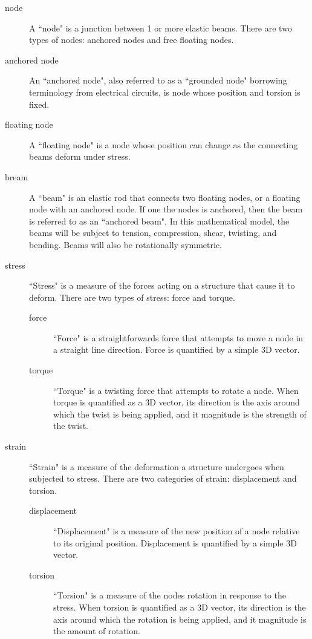 \documentclass{article}
\begin{document}
\begin{description}
\item[node] A ``node" is a junction between 1 or more elastic beams. There are two types of nodes: anchored nodes and free floating nodes.
\item[anchored node] An ``anchored node", also referred to as a ``grounded node" borrowing terminology from electrical circuits, is node whose position and torsion is fixed.
\item[floating node] A ``floating node" is a node whose position can change as the connecting beams deform under stress. 
\item[bream] A ``beam" is an elastic rod that connects two floating nodes, or a floating node with an anchored node. If one the nodes is anchored, then the beam is referred to as an ``anchored beam". In this mathematical model, the beams will be subject to tension, compression, shear, twisting, and bending. Beams will also be rotationally symmetric.
\item[stress] ``Stress" is a measure of the forces acting on a structure that cause it to deform. There are two types of stress: force and torque.
\begin{description}
\item[force] ``Force" is a straightforwards force that attempts to move a node in a straight line direction. Force is quantified by a simple 3D vector.
\item[torque] ``Torque" is a twisting force that attempts to rotate a node. When torque is quantified as a 3D vector, its direction is the axis around which the twist is being applied, and it magnitude is the strength of the twist.  
\end{description}   
\item[strain] ``Strain" is a measure of the deformation a structure undergoes when subjected to stress. There are two categories of strain: displacement and torsion.
\begin{description}
\item[displacement] ``Displacement" is a measure of the new position of a node relative to its original position. Displacement is quantified by a simple 3D vector.   
\item[torsion] ``Torsion" is a measure of the nodes rotation in response to the stress. When torsion is quantified as a 3D vector, its direction is the axis around which the rotation is being applied, and it magnitude is the amount of rotation.  
\end{description}
\end{description}
\end{document}
